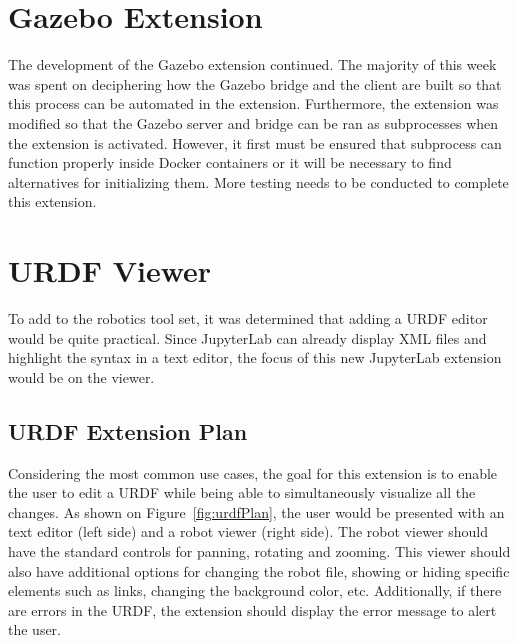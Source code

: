 \section{Gazebo Extension}

    The development of the Gazebo extension continued. The majority of this week was spent on deciphering how the Gazebo bridge and the client are built so that this process can be automated in the extension. Furthermore, the extension was modified so that the Gazebo server and bridge can be ran as subprocesses when the extension is activated. However, it first must be ensured that subprocess can function properly inside Docker containers or it will be necessary to find alternatives for initializing them. More testing needs to be conducted to complete this extension.



\section{URDF Viewer}

    To add to the robotics tool set, it was determined that adding a URDF editor would be quite practical. Since JupyterLab can already display XML files and highlight the syntax in a text editor, the focus of this new JupyterLab extension would be on the viewer.

    \subsection{URDF Extension Plan}

    Considering the most common use cases, the goal for this extension is to enable the user to edit a URDF while being able to simultaneously visualize all the changes. As shown on Figure~\ref{fig:urdfPlan}, the user would be presented with an text editor (left side) and a robot viewer (right side). The robot viewer should have the standard controls for panning, rotating and zooming. This viewer should also have additional options for changing the robot file, showing or hiding specific elements such as links, changing the background color, etc.
    Additionally, if there are errors in the URDF, the extension should display the error message to alert the user.



